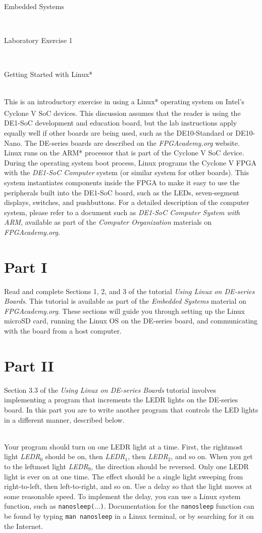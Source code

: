 \documentclass[epsfig,10pt,fullpage]{article}
\newcommand{\LabNum}{1}
\begin{document}
\centerline{\huge Embedded Systems}
~\\
\centerline{\huge Laboratory Exercise \LabNum}
~\\
\centerline{\large Getting Started with Linux*}
~\\

\noindent
This is an introductory exercise in using a Linux* operating system on Intel's Cyclone\textsuperscript{\textregistered} V SoC 
devices. This discussion assumes that the reader is using the DE1-SoC development and 
education board, but the lab instructions apply equally well if other boards are being used,
such as the DE10-Standard or DE10-Nano. The DE-series boards are described on the 
{\it FPGAcademy.org} website.  Linux runs on the ARM* processor that is part 
of the Cyclone V SoC device. During the operating system boot process, Linux programs the 
Cyclone V FPGA with the \textit{DE1-SoC Computer} system (or similar system for other
boards). This system instantiates components inside the FPGA to make it easy to use the 
peripherals built into the DE1-SoC board, such as the LEDs, seven-segment displays, switches, 
and pushbuttons. For a detailed description of the computer system, please refer to 
a document such as \textit{DE1-SoC Computer System with ARM}, available as part of the
{\it Computer Organization} materials on {\it FPGAcademy.org}.

\section*{Part I}
\noindent
Read and complete Sections 1, 2, and 3 of the tutorial \textit{Using Linux on DE-series Boards}.
This tutorial is available as part of the {\it Embedded Systems} material on {\it FPGAcademy.org}.
These sections will guide you through setting up the Linux microSD card, running the 
Linux OS on the DE-series board, and communicating with the board from a host computer. 

\section*{Part II}
\noindent
Section 3.3 of the \textit{Using Linux on DE-series Boards} tutorial involves implementing a
program that increments the LEDR lights on the DE-series board. In this part you are to
write another program that controls the LED lights in a different manner, described below.

~\\
\noindent
Your program should turn on one LEDR light at a time. First, the rightmost light 
{\it LEDR}$_0$ should be on, then {\it LEDR}$_1$, then {\it LEDR}$_2$, and so on. When you
get to the leftmost light {\it LEDR}$_{9}$, the direction should be reversed. Only one 
LEDR light is ever on at one time. The effect should be a single light sweeping from 
right-to-left, then left-to-right, and so on.  
Use a delay so that the light moves at some reasonable speed. To implement the delay, you
can use a Linux system function, such as \texttt{nanosleep($\ldots$)}. Documentation for 
the \texttt{nanosleep} function can be found by typing \texttt{man nanosleep} in a 
Linux terminal, or by searching for it on the Internet.
\end{document}
